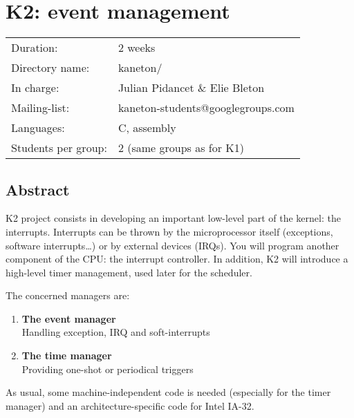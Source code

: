 
%
%

\chapter{K2: event management}

%
%

\begin{tabular}{p{7cm}l}
Duration: & 2 weeks \\
Directory name: & kaneton/ \\
In charge: & Julian Pidancet \& Elie Bleton\\
Mailing-list: & kaneton-students@googlegroups.com \\
Languages: & C, assembly \\
Students per group: & 2 (same groups as for K1) \\
\end{tabular}

\section{Abstract}

K2 project consists in developing an important low-level part of the
kernel: the interrupts. Interrupts can be thrown by the microprocessor
itself (exceptions, software interrupts\ldots) or by external devices
(IRQs). You will program another component of the CPU: the interrupt
controller. In addition, K2 will introduce a high-level timer
management, used later for the scheduler.

The concerned managers are:

\begin{enumerate}
  \item
    {\bf The event manager}\\
    Handling exception, IRQ and soft-interrupts
  \item
    {\bf The time manager}\\
    Providing one-shot or periodical triggers
\end{enumerate}

As usual, some machine-independent code is needed (especially for the
timer manager) and an architecture-specific code for Intel IA-32.

